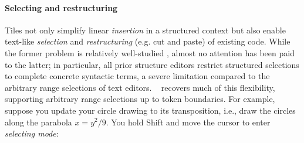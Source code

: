 \paragraph{Selecting and restructuring}
Tiles not only simplify linear \emph{insertion} in a structured
context but also enable text-like \emph{selection}
and \emph{restructuring} (e.g. cut and paste) of existing code.
While the former problem is relatively well-studied
,
almost no attention has been paid to the latter;
in particular, all prior structure editors restrict
structured selections to complete concrete syntactic terms,
a severe limitation compared to the arbitrary range
selections of text editors.
\tylr~ recovers much of this flexibility, supporting
arbitrary range selections up to token boundaries.
For example, suppose you update your circle drawing
to its transposition, i.e., draw the circles along
the parabola $x = y^2/9$.
You hold Shift and move the cursor to enter \emph{selecting mode}:

